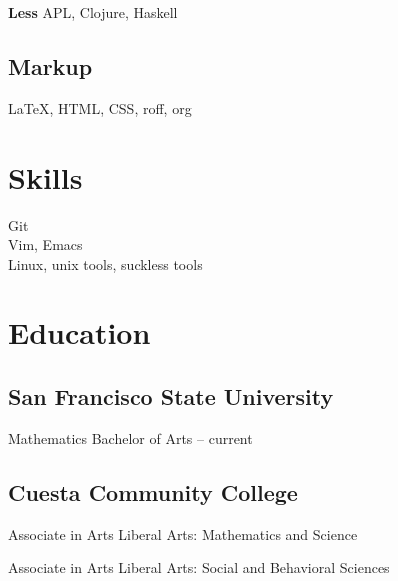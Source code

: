 {\bfseries Less} APL, Clojure, Haskell
\subsection{Markup}
{\LaTeX}, HTML, CSS, roff, org

\section{Skills}
\begin{description}
    \item[Git]{}
    \item[Vim, Emacs]{}
    \item[Linux, unix tools, suckless tools]{}
\end{description}

\section{Education}
\subsection{San Francisco State University}
Mathematics Bachelor of Arts -- current
\subsection{Cuesta Community College}
Associate in Arts
Liberal Arts: Mathematics and Science

Associate in Arts
Liberal Arts: Social and Behavioral Sciences




